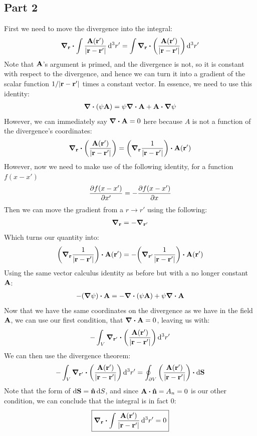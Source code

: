 \documentclass[12pt]{article}
\newcommand{\D}{\partial}
\begin{document}
\subsection*{Part 2}
First we need to move the divergence into the integral:
\begin{align*}
  \grad_{\vb{r}}\vdot\int\frac{\vb{A}(\vb{r}')}{\abs{\vb{r}-\vb{r}'}}\dd[3]{r'}=
  \int\grad_{\vb{r}}\vdot
  {\qty(\frac{\vb{A}(\vb{r}')}{\abs{\vb{r}-\vb{r}'}})}\dd[3]{r'}
\end{align*}
Note that $\vb{A}$'s argument is primed, and the divergence is not, so it is constant with respect to the divergence, and hence we can turn it into a gradient of the scalar function $1/\abs{\vb{r-r}'}$ times a constant vector. In essence, we need to use this identity:
\begin{align*}
  \div{(\psi\vb{A})}=\psi\div{\vb{A}}+\vb{A}\vdot\grad{\psi}
\end{align*}
However, we can immediately say $\div{\vb{A}=0}$ here because $A$ is not a function of the divergence's coordinates:
\begin{align*}
  \grad_{\vb{r}}\vdot\qty(\frac{\vb{A}(\vb{r}')}{\abs{\vb{r-r}'}})=
  \qty(\grad_{\vb{r}}{\frac1{\abs{\vb{r-r}'}}})\vdot\vb{A}(\vb{r}')
\end{align*}
However, now we need to make use of the following identity, for a function $f(x-x')$
\begin{align*}
  \pdv{f(x-x')}{x'}=-\pdv{f(x-x')}{x}
\end{align*}
Then we can move the gradient from a $r\to r'$ using the following:
\begin{align*}
  \grad_{\vb{r}}=-\grad_{\vb{r}'}
\end{align*}
Which turns our quantity into:
\begin{align*}
  \qty(\grad_{\vb{r}}{\frac1{\abs{\vb{r-r}'}}})\vdot\vb{A}(\vb{r}')=
  -\qty(\grad_{\vb{r}'}{\frac1{\abs{\vb{r-r}'}}})\vdot\vb{A}(\vb{r}')
\end{align*}
Using the same vector calculus identity as before but with a no longer constant $\vb{A}$:
\begin{align*}
  -(\grad{\psi})\vdot\vb{A}=-\div{(\psi\vb{A})}+\psi\div\vb{A}
\end{align*}
Now that we have the same coordinates on the divergence as we have in the field $\vb{A}$, we can use our first condition, that $\div{\vb{A}}=0$, leaving us with:
\begin{align*}
  -\int_V\grad_{\vb{r}'}\vdot\qty(\frac{\vb{A}(\vb{r}')}{\abs{\vb{r-r}'}})
  \dd[3]{r'}
\end{align*}
We can then use the divergence theorem:
\begin{align*}
  -\int_V\grad_{\vb{r}'}\vdot\qty(\frac{\vb{A}(\vb{r}')}{\abs{\vb{r-r}'}})
  \dd[3]{r'}=\oint_{\D V}\qty(\frac{\vb{A}(\vb{r}')}{\abs{\vb{r-r}'}})
  \vdot\dd{\vb{S}}
\end{align*}
Note that the form of $\dd{\vb{S}}=\vu{n}\dd{S}$, and since $\vb{A}\vdot\vu{n}=A_n=0$ is our other condition, we can conclude that the integral is in fact $0$:
\begin{align}
  \boxed{
    \grad_{\vb{r}}\vdot\int
    \frac{\vb{A}(\vb{r}')}{\abs{\vb{r}-\vb{r}'}}\dd[3]{r'}=0
  }
\end{align}
\newpage
\end{document}
